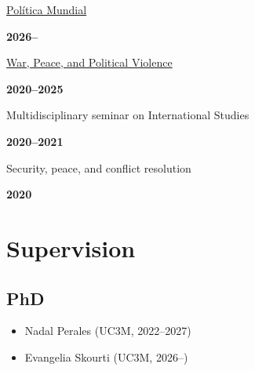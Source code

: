 \documentclass[a4paper, 12pt]{article}
\begin{document}
\begin{minipage}[t]{0.85\textwidth}
\href{https://franvillamil.github.io/pol_mundial/}{Política Mundial}\\\vspace{-8pt}
\end{minipage}\hfill\begin{minipage}[t]{0.12\textwidth}
\flushright\textbf{2026--}
\end{minipage}
\begin{minipage}[t]{0.85\textwidth}
\href{https://franvillamil.github.io/wp_polvio/}{War, Peace, and Political Violence}\\\vspace{-8pt}
\end{minipage}\hfill\begin{minipage}[t]{0.12\textwidth}
\flushright\textbf{2020--2025}
\end{minipage}
\begin{minipage}[t]{0.85\textwidth}
Multidisciplinary seminar on International Studies\\\vspace{-8pt}
\end{minipage}\hfill\begin{minipage}[t]{0.12\textwidth}
\flushright\textbf{2020--2021}
\end{minipage}
\begin{minipage}[t]{0.85\textwidth}
Security, peace, and conflict resolution\\\vspace{-8pt}
\end{minipage}\hfill\begin{minipage}[t]{0.12\textwidth}
\flushright\textbf{2020}
\end{minipage}


\section*{Supervision}

\subsection*{PhD}

\begin{itemize}[leftmargin=*, nolistsep]
	\item Nadal Perales (UC3M, 2022--2027)
	\item Evangelia Skourti (UC3M, 2026--)
\end{itemize}
\end{document}

